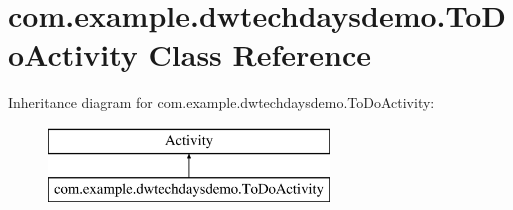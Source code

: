 \hypertarget{classcom_1_1example_1_1dwtechdaysdemo_1_1_to_do_activity}{}\section{com.\+example.\+dwtechdaysdemo.\+To\+Do\+Activity Class Reference}
\label{classcom_1_1example_1_1dwtechdaysdemo_1_1_to_do_activity}
Inheritance diagram for com.\+example.\+dwtechdaysdemo.\+To\+Do\+Activity\+:\begin{figure}[H]
\begin{center}
\leavevmode
\includegraphics[height=2.000000cm]{classcom_1_1example_1_1dwtechdaysdemo_1_1_to_do_activity}
\end{center}
\end{figure}
